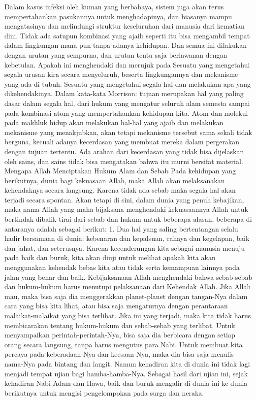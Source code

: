 \documentclass[]{article}
\begin{document}
Dalam kasus infeksi oleh kuman yang berbahaya, sistem juga akan terus mempertahankan pasukannya untuk menghadapinya, dan biasanya mampu mengatasinya dan melindungi struktur keseluruhan dari manusia dari kematian dini. Tidak ada satupun kombinasi yang ajaib seperti itu bisa mengambil tempat dalam lingkungan mana pun tanpa adanya kehidupan. Dan semua ini dilakukan dengan urutan yang sempurna, dan urutan tentu saja berlawanan dengan kebetulan. 
Apakah ini menghendaki dan merujuk pada Sesuatu yang mengetahui segala  urusan kira secara menyeluruh,  beserta lingkungannya dan mekanisme yang ada di tubuh. Sesuatu yang mengetahui segala hal dan melakukan apa yang dikehendakinya. Dalam kata-kata Morrison: tujuan merupakan hal yang paling dasar dalam segala hal, dari hukum yang mengatur seluruh alam semesta sampai pada kombinasi atom yang mempertahankan kehidupan kita. Atom dan molekul pada makhluk hidup akan melakukan hal-hal yang ajaib dan melakukan mekanisme yang menakjubkan, akan tetapi mekanisme tersebut sama sekali tidak berguna, kecuali adanya kecerdasan yang membuat mereka dalam pergerakan dengan tujuan tertentu.  Ada arahan dari kecerdasan yang tidak bisa dijelaskan oleh sains, dan sains tidak bisa mengatakan bahwa itu murni bersifat material.
Mengapa Allah Menciptakan Hukum Alam dan Sebab
Pada kehidupan yang berikutnya, dunia bagi kekuasaan Allah, maka Allah akan melaksanakan kehendaknya secara langsung. Karena tidak ada sebab maka segala hal akan terjadi secara spontan. Akan tetapi di sini, dalam dunia yang penuh kebajikan, maka nama Allah yang  maha bijaksana menghendaki kekuasaannya Allah untuk bertindak dibalik tirai dari sebab dan hukum untuk beberapa alasan, beberapa di antaranya adalah sebagai berikut: 
1. Dua hal yang saling bertentangan selalu hadir bersamaan di dunia: kebenaran dan kepalsuan, cahaya dan kegelapan, baik dan jahat, dan seterusnya. Karena kecenderungan kita sebagai manusia menuju pada baik dan buruk, kita akan diuji untuk melihat apakah kita akan menggunakan kehendak bebas kita atau tidak serta kemampuan lainnya pada jalan yang benar dan baik. Kebijaksanaan Allah menghendaki bahwa sebab-sebab dan hukum-hukum harus menutupi pelaksanaan dari Kehendak Allah. Jika Allah mau, maka bisa saja dia menggerakkan planet-planet dengan tangan-Nya dalam cara yang bisa kita lihat, atau bisa saja mengaturnya dengan perantaraan malaikat-malaikat yang bisa terlihat. Jika ini yang terjadi, maka kita tidak harus membicarakan tentang hukum-hukum dan sebab-sebab yang terlibat. Untuk menyampaikan perintah-perintah-Nya, bisa saja dia berbicara dengan setiap orang secara langsung, tanpa harus mengutus para Nabi. Untuk membuat kita percaya pada keberadaan-Nya dan keesaan-Nya, maka dia bisa saja menulis nama-Nya pada bintang dan langit. Namun kehadiran kita di dunia ini tidak lagi menjadi tempat ujian bagi hamba-hamba-Nya. Sebagai hasil dari ujian ini, sejak kehadiran Nabi Adam dan Hawa, baik dan buruk mengalir di dunia ini ke dunia berikutnya untuk mengisi pengelompokan pada surga dan neraka.
\end{document}
